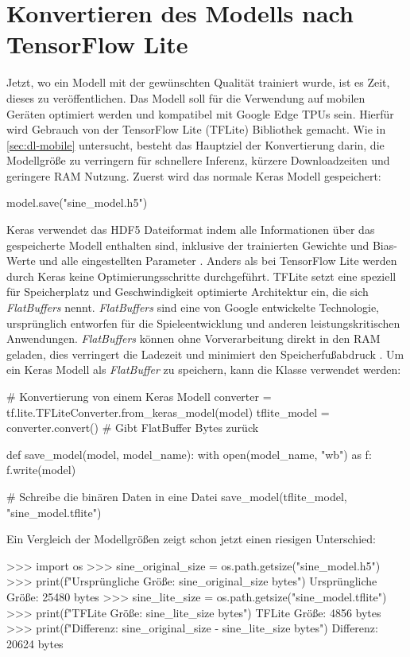 \section{Konvertieren des Modells nach TensorFlow Lite}
Jetzt, wo ein Modell mit der gewünschten Qualität trainiert
wurde, ist es Zeit, dieses zu veröffentlichen.
Das Modell soll für die Verwendung auf mobilen Geräten optimiert werden
und kompatibel mit Google Edge TPUs sein.
Hierfür wird Gebrauch von der TensorFlow Lite (TFLite) Bibliothek gemacht.
Wie in \autoref{sec:dl-mobile} untersucht,
besteht das Hauptziel der Konvertierung darin, die Modellgröße zu verringern
für schnellere Inferenz, kürzere Downloadzeiten und geringere RAM Nutzung.
Zuerst wird das normale Keras Modell gespeichert:
\begin{pythoncode}
model.save("sine_model.h5")
\end{pythoncode}
Keras verwendet das HDF5 Dateiformat
indem alle Informationen über das gespeicherte Modell enthalten sind,
inklusive der trainierten Gewichte und Bias-Werte und alle eingestellten
Parameter \parencite[314]{book:hands-on-ml}.
Anders als bei TensorFlow Lite werden durch Keras keine Optimierungsschritte
durchgeführt.
TFLite setzt eine speziell für Speicherplatz und Geschwindigkeit
optimierte Architektur ein,
die sich \textit{FlatBuffers} nennt.
\textit{FlatBuffers} sind eine von Google
entwickelte Technologie, ursprünglich entworfen für die Spieleentwicklung
und anderen leistungskritischen Anwendungen.
\textit{FlatBuffers} können ohne Vorverarbeitung direkt in den RAM
geladen, dies verringert die Ladezeit
und minimiert den Speicherfußabdruck \parencite[685]{book:hands-on-ml}.
Um ein Keras Modell als \textit{FlatBuffer} zu speichern, kann die
 Klasse verwendet werden:
\begin{pythoncode}
# Konvertierung von einem Keras Modell
converter = tf.lite.TFLiteConverter.from_keras_model(model)
tflite_model = converter.convert() # Gibt FlatBuffer Bytes zurück

def save_model(model, model_name):
    with open(model_name, "wb") as f:
        f.write(model)

# Schreibe die binären Daten in eine Datei
save_model(tflite_model, "sine_model.tflite")
\end{pythoncode}
Ein Vergleich der Modellgrößen zeigt schon jetzt einen riesigen Unterschied:
\begin{pyconcode}
>>> import os
>>> sine_original_size = os.path.getsize("sine_model.h5")
>>> print(f"Ursprüngliche Größe: {sine_original_size} bytes")
Ursprüngliche Größe: 25480 bytes
>>> sine_lite_size = os.path.getsize("sine_model.tflite")
>>> print(f"TFLite Größe: {sine_lite_size} bytes")
TFLite Größe: 4856 bytes
>>> print(f"Differenz: {sine_original_size - sine_lite_size} bytes")
Differenz: 20624 bytes
\end{pyconcode}

